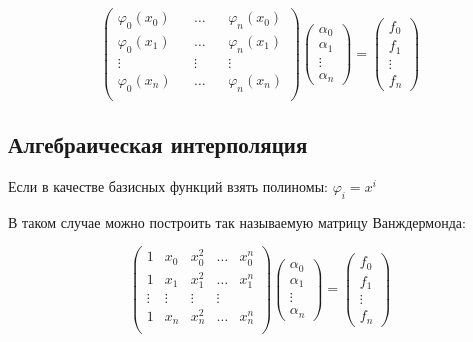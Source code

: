 \documentclass[10pt,a4paper]{article}
\begin{document}
	\begin{equation}
		\begin{pmatrix}
			\varphi_{0}\left(x_{0}\right) && \ldots && \varphi_{n}\left(x_{0}
			\right) \\
			\varphi_{0}\left(x_{1}\right) && \ldots && \varphi_{n}\left(x_{1}
			\right) \\
			\vdots && \vdots && \vdots \\
			\varphi_{0}\left(x_{n}\right) && \ldots && \varphi_{n}\left(x_{n}
			\right) \\
		\end{pmatrix} \begin{pmatrix}
			\alpha_{0}\\
			\alpha_{1}\\
			\vdots\\
			\alpha_{n}
		\end{pmatrix} = \begin{pmatrix}
			f_{0}\\
			f_{1}\\
			\vdots\\
			f_{n}		
		\end{pmatrix}
	\end{equation}
	
	\subsection{Алгебраическая интерполяция}
	
		Если в качестве базисных функций взять полиномы: $\varphi_{i} = x^{i}$
		
		В таком случае можно построить так называемую матрицу Ванждермонда:
		
		\begin{equation}
			\begin{pmatrix}
			1 & x_{0} & x_{0}^{2} & \ldots & x_{0}^{n}\\
			1 & x_{1} & x_{1}^{2} & \ldots & x_{1}^{n}\\			
			\vdots & \vdots & \vdots & \vdots \\
			1 & x_{n} & x_{n}^{2} & \ldots & x_{n}^{n}\\
			\end{pmatrix}
			\begin{pmatrix}
				\alpha_{0}\\
				\alpha_{1}\\
				\vdots\\
				\alpha_{n}
			\end{pmatrix}
			 = 
			 \begin{pmatrix}
				f_{0}\\
				f_{1}\\
				\vdots\\
				f_{n}		
			\end{pmatrix}
		\end{equation}
		
\end{document}
